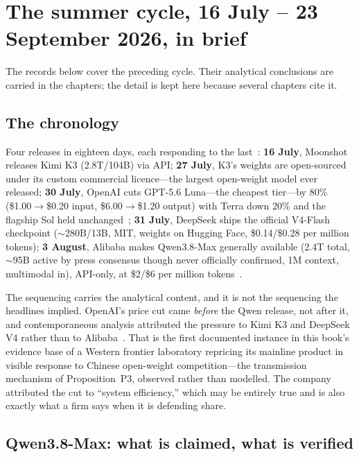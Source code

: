 \section{The summer cycle, 16 July -- 23 September 2026, in brief}

The records below cover the preceding cycle. Their analytical conclusions are carried in the chapters; the detail is kept here because several chapters cite it.

\subsection{The chronology}

Four releases in eighteen days, each responding to the last~\cite{pareto-frontier}: \textbf{16 July}, Moonshot releases Kimi K3 (2.8T/104B) via API; \textbf{27 July}, K3's weights are open-sourced under its custom commercial licence---the largest open-weight model ever released; \textbf{30 July}, OpenAI cuts GPT-5.6 Luna---the cheapest tier---by 80\% (\$1.00$\to$\$0.20 input, \$6.00$\to$\$1.20 output) with Terra down 20\% and the flagship Sol held unchanged~\cite{openai-cut,openai-luna}; \textbf{31 July}, DeepSeek ships the official V4-Flash checkpoint ($\sim$280B/13B, MIT, weights on Hugging Face, \$0.14/\$0.28 per million tokens); \textbf{3 August}, Alibaba makes Qwen3.8-Max generally available (2.4T total, $\sim$95B active by press consensus though never officially confirmed, 1M context, multimodal in), API-only, at \$2/\$6 per million tokens~\cite{qwen38-max}.

The sequencing carries the analytical content, and it is not the sequencing the headlines implied. OpenAI's price cut came \emph{before} the Qwen release, not after it, and contemporaneous analysis attributed the pressure to Kimi K3 and DeepSeek V4 rather than to Alibaba~\cite{openai-cut}. That is the first documented instance in this book's evidence base of a Western frontier laboratory repricing its mainline product in visible response to Chinese open-weight competition---the transmission mechanism of Proposition~P3, observed rather than modelled. The company attributed the cut to ``system efficiency,'' which may be entirely true and is also exactly what a firm says when it is defending share.

\subsection{Qwen3.8-Max: what is claimed, what is verified}

